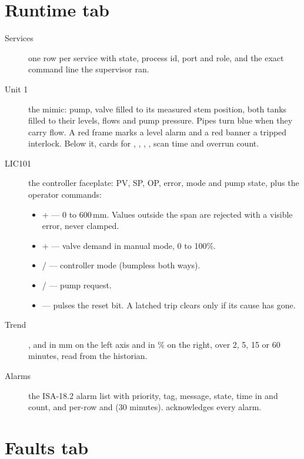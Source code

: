 \section{Runtime tab}

\begin{description}
  \item[Services] one row per service with state, process id, port and role,
        and the exact command line the supervisor ran.
  \item[Unit 1] the mimic: pump, valve filled to its measured stem position,
        both tanks filled to their levels, flows and pump pressure. Pipes turn
        blue when they carry flow. A red frame marks a level alarm and a red
        banner a tripped interlock. Below it, cards for ,
        , , , scan time and overrun count.
  \item[LIC101] the controller faceplate: PV, SP, OP, error, mode and pump
        state, plus the operator commands:
        \begin{itemize}
          \item {} +  --- 0 to 600\,mm. Values outside
                the span are rejected with a visible error, never clamped.
          \item {} +  --- valve demand in manual mode, 0 to 100\%.
          \item {} /  --- controller mode (bumpless both ways).
          \item {} /  --- pump request.
          \item {} --- pulses the reset bit. A latched trip
                clears only if its cause has gone.
        \end{itemize}
  \item[Trend] ,  and  in mm on the left
        axis and  in \% on the right, over 2, 5, 15 or 60
        minutes, read from the historian.
  \item[Alarms] the ISA-18.2 alarm list with priority, tag, message, state,
        time in and count, and per-row  and  (30 minutes).
         acknowledges every alarm.
\end{description}

\section{Faults tab}

